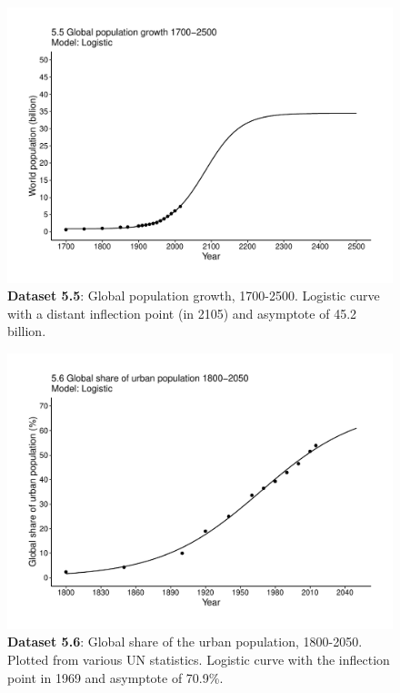 \documentclass[aps,rmp,preprint,superscriptaddress,10pt,onecolumn]{article}
\begin{document}
\clearpage
\begin{figure}[h]
\includegraphics[width=\textwidth]{output/figs-ggplot/5.5.pdf}
\caption{\textbf{Dataset 5.5}: Global population growth, 1700-2500. Logistic curve with a distant inflection point (in 2105) and asymptote of 45.2 billion. }
\end{figure}
	
\clearpage
\begin{figure}[h]
\includegraphics[width=\textwidth]{output/figs-ggplot/5.6.pdf}
\caption{\textbf{Dataset 5.6}: Global share of the urban population, 1800-2050. Plotted from various UN statistics. Logistic curve with the inflection point in 1969 and asymptote of 70.9\%.}
\end{figure}
	
\end{document}
